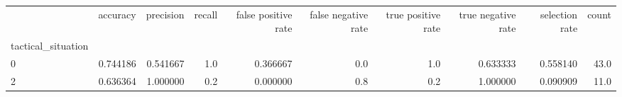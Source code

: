 \begin{tabular}{lrrrrrrrrr}
\toprule
{} &  accuracy &  precision &  recall &  false positive rate &  false negative rate &  true positive rate &  true negative rate &  selection rate &  count \\
tactical\_situation &           &            &         &                      &                      &                     &                     &                 &        \\
\midrule
0                  &  0.744186 &   0.541667 &     1.0 &             0.366667 &                  0.0 &                 1.0 &            0.633333 &        0.558140 &   43.0 \\
2                  &  0.636364 &   1.000000 &     0.2 &             0.000000 &                  0.8 &                 0.2 &            1.000000 &        0.090909 &   11.0 \\
\bottomrule
\end{tabular}
